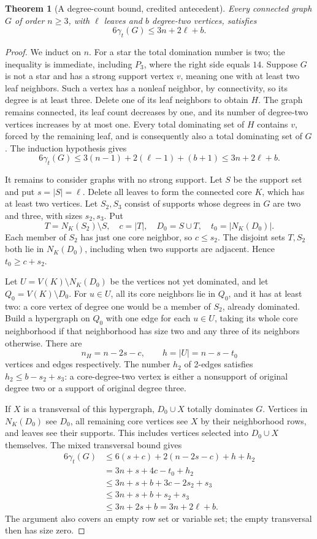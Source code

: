 \documentclass[11pt,a4paper]{article}
\newtheorem{theorem}{Theorem}[section]
\theoremstyle{definition}\newtheorem{definition}[theorem]{Definition}
\theoremstyle{remark}\newtheorem{remark}[theorem]{Remark}
\begin{document}
\begin{theorem}[A degree-count bound, credited antecedent]
\label{early:thm:td-degree-count}
Every connected graph $G$ of order $n\geq3$, with $\ell$ leaves
and $b$ degree-two vertices, satisfies
\[
 6\gamma_t(G)\leq3n+2\ell+b.
\]
\end{theorem}
\begin{proof}
We induct on $n$.  For a star the total domination number is two;
the inequality is immediate, including $P_3$, where the right side
equals $14$.  Suppose $G$ is not a star and has a strong support
vertex $v$, meaning one with at least two leaf neighbors.  Such a
vertex has a nonleaf neighbor, by connectivity, so its degree is
at least three.  Delete one of its leaf neighbors to obtain $H$.
The graph remains connected, its leaf count decreases by one, and
its number of degree-two vertices increases by at most one.  Every
total dominating set of $H$ contains $v$, forced by the remaining
leaf, and is consequently also a total dominating set of $G$.
The induction hypothesis gives
\[
 6\gamma_t(G)\leq3(n-1)+2(\ell-1)+(b+1)
 \leq3n+2\ell+b.
\]

It remains to consider graphs with no strong support.  Let $S$ be
the support set and put $s=|S|=\ell$.  Delete all leaves to form
the connected core $K$, which has at least two vertices.  Let
$S_2,S_3$ consist of supports whose degrees in $G$ are two and
three, with sizes $s_2,s_3$.  Put
\[
 T=N_K(S_2)\setminus S,\quad c=|T|,\quad D_0=S\cup T,
 \quad t_0=|N_K(D_0)|.
\]
Each member of $S_2$ has just one core neighbor, so $c\leq s_2$.
The disjoint sets $T,S_2$ both lie in $N_K(D_0)$, including when
two supports are adjacent.  Hence $t_0\geq c+s_2$.

Let $U=V(K)\setminus N_K(D_0)$ be the vertices not yet dominated,
and let $Q_0=V(K)\setminus D_0$.  For $u\in U$, all its core
neighbors lie in $Q_0$, and it has at least two: a core vertex of
degree one would be a member of $S_2$, already dominated.  Build a
hypergraph on $Q_0$ with one edge for each $u\in U$, taking its
whole core neighborhood if that neighborhood has size two and
any three of its neighbors otherwise.  There are
\[
 n_H=n-2s-c,\qquad h=|U|=n-s-t_0
\]
vertices and edges respectively.  The number $h_2$ of 2-edges
satisfies $h_2\leq b-s_2+s_3$: a core-degree-two vertex is either
a nonsupport of original degree two or a support of original
degree three.

If $X$ is a transversal of this hypergraph, $D_0\cup X$ totally
dominates $G$.  Vertices in $N_K(D_0)$ see $D_0$, all remaining
core vertices see $X$ by their neighborhood rows, and leaves see
their supports.  This includes vertices selected into $D_0\cup X$
themselves.  The mixed transversal bound gives
\begin{align*}
 6\gamma_t(G)
 &\leq6(s+c)+2(n-2s-c)+h+h_2\\
 &=3n+s+4c-t_0+h_2\\
 &\leq3n+s+b+3c-2s_2+s_3\\
 &\leq3n+s+b+s_2+s_3\\
 &\leq3n+2s+b=3n+2\ell+b.
\end{align*}
The argument also covers an empty row set or variable set; the
empty transversal then has size zero.
\end{proof}
\end{document}
